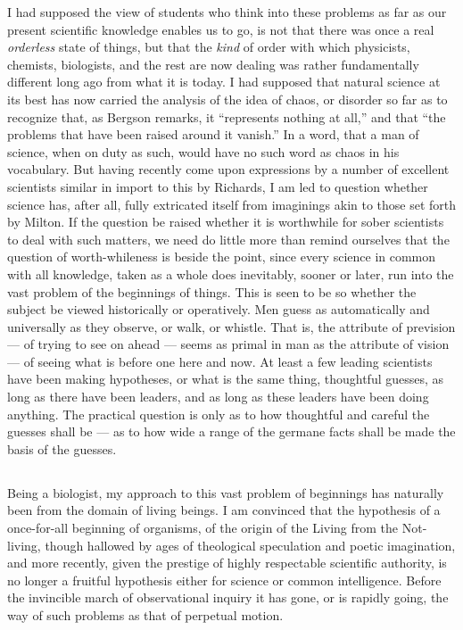 \documentclass[a4paper, 11pt, oneside, polutonikogreek, english, landscape]{article}
\begin{document}
I had supposed the view of students who think into these problems as far as our present scientific knowledge enables us to go, is not that there was once a real \emph{orderless} state of things, but that the \emph{kind} of order with which physicists, chemists, biologists, and the rest are now dealing was rather fundamentally different long ago from what it is today. I had supposed that natural science at its best has now carried the analysis of the idea of chaos, or disorder so far as to recognize that, as Bergson remarks, it ``represents nothing at all,'' and that ``the problems that have been raised around it vanish.'' In a word, that a man of science, when on duty as such, would have no such word as chaos in his vocabulary. But having recently come upon expressions by a number of excellent scientists similar in import to this by Richards, I am led to question whether science has, after all, fully extricated itself from imaginings akin to those set forth by Milton. If the question be raised whether it is worthwhile for sober scientists to deal with such matters, we need do little more than remind ourselves that the question of worth-whileness is beside the point, since every science in common with all knowledge, taken as a whole does inevitably, sooner or later, run into the vast problem of the beginnings of things. This is seen to be so whether the subject be viewed historically or operatively. Men guess as automatically and universally as they observe, or walk, or whistle. That is, the attribute of prevision --- of trying to see on ahead --- seems as primal in man as the attribute of vision --- of seeing what is before one here and now. At least a few leading scientists have been making hypotheses, or what is the same thing, thoughtful guesses, as long as there have been leaders, and as long as these leaders have been doing anything. The practical question is only as to how thoughtful and careful the guesses shall be --- as to how wide a range of the germane facts shall be made the basis of the guesses.

\subsection{}
\paragraph{}
Being a biologist, my approach to this vast problem of beginnings has naturally been from the domain of living beings. I am convinced that the hypothesis of a once-for-all beginning of organisms, of the origin of the Living from the Not-living, though hallowed by ages of theological speculation and poetic imagination, and more recently, given the prestige of highly respectable scientific authority, is no longer a fruitful hypothesis either for science or common intelligence. Before the invincible march of observational inquiry it has gone, or is rapidly going, the way of such problems as that of perpetual motion.
\end{document}

